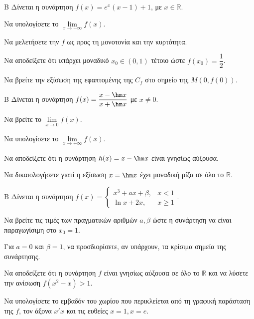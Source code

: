 \begin{thema}{Β}
Δίνεται η συνάρτηση $f(x) = e^x (x-1) + 1$, με $x \in \mathbb{R}$.
\begin{erwthma}
\item Να υπολογίσετε το $\lim\limits_{x \to -\infty} f(x)$.
\item Να μελετήσετε την $f$ ως προς τη μονοτονία και την κυρτότητα.
\item Να αποδείξετε ότι υπάρχει μοναδικό $x_0 \in (0, 1)$ τέτοιο ώστε $f(x_0) = \dfrac{1}{2}$.
\item Να βρείτε την εξίσωση της εφαπτομένης της $C_f$ στο σημείο της $M(0, f(0))$.
\end{erwthma}
\end{thema}

\begin{thema}{Β}
Δίνεται η συνάρτηση $f(x) = \dfrac{x - \hm x}{x + \hm x}$ με $x\ne0$.
\begin{erwthma}
\item Να βρείτε το $\lim\limits_{x \to 0} f(x)$.
\item Να υπολογίσετε το $\lim\limits_{x \to +\infty} f(x)$.
\item Να αποδείξετε ότι η συνάρτηση $h(x) = x - \hm x$ είναι γνησίως αύξουσα.
\item Να δικαιολογήσετε γιατί η εξίσωση $x = \hm x$ έχει μοναδική ρίζα σε όλο το $\mathbb{R}$.
\end{erwthma}
\end{thema}

\begin{thema}{Β}
Δίνεται η συνάρτηση $f(x) = \begin{cases} x^3 + ax + \beta, & x < 1 \\ \ln x + 2x, & x \ge 1 \end{cases}$.
\begin{erwthma}
  \item Να βρείτε τις τιμές των πραγματικών αριθμών $a, \beta$ ώστε η συνάρτηση να είναι παραγωγίσιμη στο $x_0=1$.
  \item Για $a = 0$ και $\beta = 1$, να προσδιορίσετε, αν υπάρχουν, τα κρίσιμα σημεία της συνάρτησης.
  \item Να αποδείξετε ότι η συνάρτηση $f$ είναι γνησίως αύξουσα σε όλο το $\mathbb{R}$ και να λύσετε την ανίσωση $f(x^2 - x) > 1$.
  \item Να υπολογίσετε το εμβαδόν του χωρίου που περικλείεται από τη γραφική παράσταση της $f$, τον άξονα $x'x$ και τις ευθείες $x=1, x=e$.
\end{erwthma}
\end{thema}


